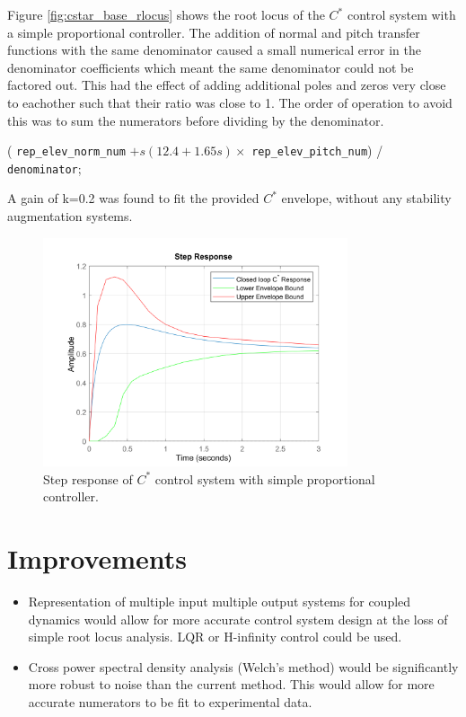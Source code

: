 \documentclass{article}
\begin{document}
Figure \ref{fig:cstar_base_rlocus} shows the root locus of the $C^*$ control system with a simple proportional controller.
The addition of normal and pitch transfer functions with the same denominator caused a small numerical error in the denominator coefficients
which meant the same denominator could not be factored out.
This had the effect of adding additional poles and zeros very close to eachother such that their ratio was close to 1.
The order of operation to avoid this was to sum the numerators before dividing by the denominator.

\begin{center}
     ( \texttt{rep\_elev\_norm\_num} $ + s(12.4 + 1.65s) \times $  \texttt{rep\_elev\_pitch\_num}) / \texttt{denominator};
\end{center}

A gain of k=0.2 was found to fit the provided $C^*$ envelope, without any stability augmentation systems.

\begin{figure}[H]
    \centering
    \includegraphics[width=0.8\textwidth]{figures/cstar_envelope_step.png}
    \caption{Step response of $C^*$ control system with simple proportional controller.}
    \label{fig:cstar_base_step}
\end{figure}

\section{Improvements}

\begin{itemize}
    \item Representation of multiple input multiple output systems for coupled dynamics would allow for more accurate control system design at the loss of simple root locus analysis. LQR or H-infinity control could be used.
    \item Cross power spectral density analysis (Welch's method) would be significantly more robust to noise than the current method.
    This would allow for more accurate numerators to be fit to experimental data.
\end{itemize}
\end{document}
